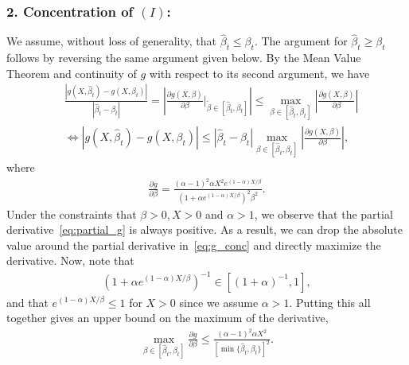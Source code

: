 \documentclass[runningheads]{llncs}
\begin{document}
\begin{subappendices}
\subsubsection{2. Concentration of $(I)$:}
        We assume, without loss of generality, that $\hat{\beta}_t \leq \beta_t$.
        The argument for $\hat{\beta}_t \geq \beta_t$ follows by reversing
        the same argument given below.
        By the Mean Value Theorem and continuity of $g$ with respect to
        its second argument, we have
        \begin{align}
          \label{eq:g_conc}
          &\frac{|g(X,\hat{\beta}_t) - g(X,\beta_t)|}{|\hat{\beta}_t-\beta_t|}
            = \left| \frac{\partial g(X,\beta)}{\partial \beta}
            \Bigg|_{\tilde{\beta} \in [\hat{\beta}_t, \beta_t]}
            \right|
              \leq \max_{\beta \in [\hat{\beta}_t, \beta_t]}
              \left| \frac{\partial g(X,\beta)}{\partial \beta} \right|
              \nonumber
          \\ & \iff
               |g(X, \hat{\beta}_t) - g(X, \beta_t)|
               \leq |\hat{\beta}_t - \beta_t |
               \max_{\beta \in [\hat{\beta}_t, \beta_t]}
               \left| \frac{\partial g(X,\beta)}{\partial \beta} \right|,
        \end{align}
        where
        \begin{align}
          \label{eq:partial_g}
        \frac{\partial g}{\partial \beta}
          = \frac{(\alpha-1)^2 \alpha X^2 e ^{(1-\alpha)X/\beta}}
          {(1+\alpha e ^{(1-\alpha)X / \beta})^2 \beta^2}.
        \end{align}
        Under the constraints that $\beta >0, X > 0$ and $\alpha >1$, we observe
        that the partial derivative~\eqref{eq:partial_g} is always positive. As a
        result, we can drop the absolute value around the partial derivative
        in~\eqref{eq:g_conc} and directly maximize the derivative.
        Now, note that
        \begin{align*}
          (1+\alpha e^{(1-\alpha)X/\beta})^{-1} \in [(1+\alpha)^{-1}, 1],
        \end{align*}
        and that $e^{(1-\alpha)X/\beta} \leq 1$ for $X>0$ since we assume
        $\alpha > 1$.
        Putting this all together gives an upper bound on the maximum of the derivative,
        \begin{align*}
          \max_{\beta \in [\hat{\beta}_t, \beta_t]} \frac{\partial g}{\partial \beta}
          \leq
          \frac{(\alpha - 1)^2\alpha X^2}{[\min\{\hat{\beta}_t, \beta_t\}]^2}.

\end{align*}
\end{subappendices}
\end{document}
